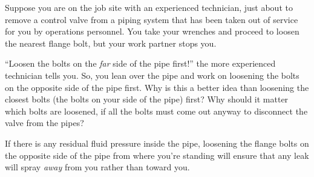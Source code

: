 

Suppose you are on the job site with an experienced technician, just about to remove a control valve from a piping system that has been taken out of service for you by operations personnel.  You take your wrenches and proceed to loosen the nearest flange bolt, but your work partner stops you.

``Loosen the bolts on the {\it far} side of the pipe first!'' the more experienced technician tells you.  So, you lean over the pipe and work on loosening the bolts on the opposite side of the pipe first.  Why is this a better idea than loosening the closest bolts (the bolts on your side of the pipe) first?  Why should it matter which bolts are loosened, if all the bolts must come out anyway to disconnect the valve from the pipes?







If there is any residual fluid pressure inside the pipe, loosening the flange bolts on the opposite side of the pipe from where you're standing will ensure that any leak will spray {\it away} from you rather than toward you.











